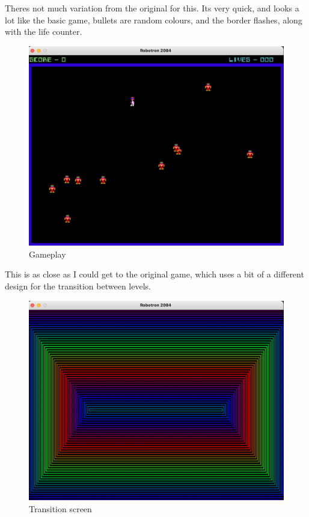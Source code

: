 \newpage
Theres not much variation from the original for this. Its very quick, and looks a lot like the basic game, bullets are random colours, and the border flashes, along with the life counter.
\begin{figure}[H]
  \includegraphics[width=1\linewidth]{Figures/gameplay.png}
  \centering
  \caption{Gameplay}
  \label{fig:HCI5}
\end{figure}
\newpage
This is as close as I could get to the original game, which uses a bit of a different design for the transition between levels.
\begin{figure}[H]
  \includegraphics[width=1\linewidth]{Figures/trans.png}
  \centering
  \caption{Transition screen}
  \label{fig:HCI6}
\end{figure}